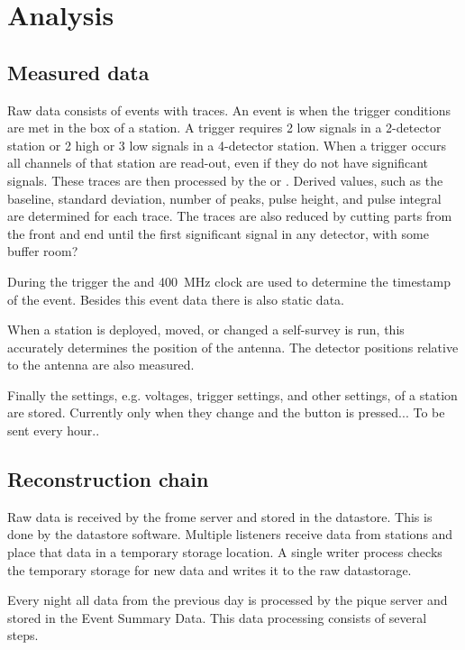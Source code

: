 \chapter{Analysis}
\label{ch:analysis}


\section{Measured data}

Raw data consists of events with traces. An event is when the trigger
conditions are met in the \hisparc box of a station. A trigger requires
2 low signals in a 2-detector station or 2 high or 3 low signals in a
4-detector station. When a trigger occurs all \pmt channels of that
station are read-out, even if they do not have significant signals.
These traces are then processed by the \daq or \pysparc. Derived
values, such as the baseline, standard deviation, number of peaks,
pulse height, and pulse integral are determined for each trace. The traces
are also reduced by cutting parts from the front and end until the first
significant signal in any detector, with some buffer room?

During the trigger the \gps and \SI{400}{\mega\hertz} clock are used to
determine the \gps timestamp of the event. Besides this event data there
is also static data.

When a station is deployed, moved, or changed a \gps self-survey is run,
this accurately determines the position of the \gps antenna. The
detector positions relative to the \gps antenna are also measured.

Finally the settings, e.g. \pmt voltages, trigger settings, and other
settings, of a station are stored. Currently only when they change and
the button is pressed... To be sent every hour..



\section{Reconstruction chain}

Raw data is received by the frome server and stored in the \hisparc
datastore. This is done by the datastore software. Multiple listeners
receive data from stations and place that data in a temporary storage
location. A single writer process checks the temporary storage for new
data and writes it to the raw datastorage.

Every night all data from the previous day is processed by the pique
server and stored in the Event Summary Data. This data processing
consists of several steps.

